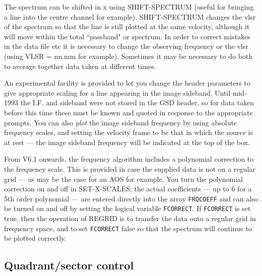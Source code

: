 \documentclass[11pt,twoside]{report}
\begin{document}
The spectrum can be shifted in x using SHIFT-SPECTRUM (useful for bringing a
line into the centre channel for example). SHIFT-SPECTRUM changes the vlsr of
 the spectrum so that the line is still plotted at the same
velocity, although it will move within the total ``passband" or spectrum. In
order to correct mistakes in the data file etc it is necessary to change the
observing frequency or the vlsr (using VLSR = nn.mm for example).
Sometimes it may be necessary to do both to average together data
 taken at different times.

An experimental facility is provided to let you change the header parameters to
give appropriate scaling for a line appearing in the image sideband.
 
Until mid-1993 the I.F.  and sideband were not stored in the GSD header, so for data taken
before this time these must be known and quoted in
response to the appropriate prompts.
You can also {\em plot} the image sideband
frequency by using absolute frequency scales, and setting the velocity frame
to be that in which the source is at rest --- the image sideband frequency
will be indicated at the top of the box.

From V6.1 onwards, the frequency algorithm includes a polynomial correction to
the frequency scale. This is provided in case the supplied data is not on a
regular grid --- as may be the case for an AOS for example. You turn the
polynomial correction on and off in SET-X-SCALES; the actual coefficients ---
up to 6 for a 5th order polynomial --- are entered directly into the array
\verb+FRQCOEFF+ and can also be turned on and off by
setting the logical variable \verb+FCORRECT+. If
\verb+FCORRECT+ is set true, then the operation of REGRID is to transfer the
data onto a regular grid in frequency space, and to set \verb+FCORRECT+ false
so that the spectrum will continue to be plotted correctly.

\subsection{Quadrant/sector control}
 
\end{document}
